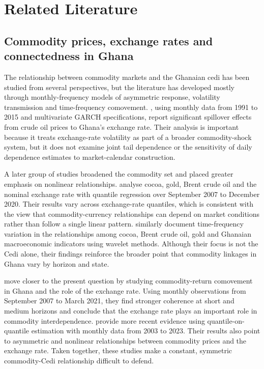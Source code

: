\section{Related Literature}
\label{sec:related_literature}

\subsection{Commodity prices, exchange rates and connectedness in Ghana}

The relationship between commodity markets and the Ghanaian cedi has been studied from several perspectives, but the literature has developed mostly through monthly-frequency models of asymmetric response, volatility transmission and time-frequency comovement. \citet{zankawah2020}, using monthly data from 1991 to 2015 and multivariate GARCH specifications, report significant spillover effects from crude oil prices to Ghana's exchange rate. Their analysis is important because it treats exchange-rate volatility as part of a broader commodity-shock system, but it does not examine joint tail dependence or the sensitivity of daily dependence estimates to market-calendar construction.

A later group of studies broadened the commodity set and placed greater emphasis on nonlinear relationships. \citet{archer2022} analyse cocoa, gold, Brent crude oil and the nominal exchange rate with quantile regression over September 2007 to December 2020. Their results vary across exchange-rate quantiles, which is consistent with the view that commodity-currency relationships can depend on market conditions rather than follow a single linear pattern. \citet{boateng2022} similarly document time-frequency variation in the relationships among cocoa, Brent crude oil, gold and Ghanaian macroeconomic indicators using wavelet methods. Although their focus is not the Cedi alone, their findings reinforce the broader point that commodity linkages in Ghana vary by horizon and state.

\citet{barson2023} move closer to the present question by studying commodity-return comovement in Ghana and the role of the exchange rate. Using monthly observations from September 2007 to March 2021, they find stronger coherence at short and medium horizons and conclude that the exchange rate plays an important role in commodity interdependence. \citet{yeboah2025} provide more recent evidence using quantile-on-quantile estimation with monthly data from 2003 to 2023. Their results also point to asymmetric and nonlinear relationships between commodity prices and the exchange rate. Taken together, these studies make a constant, symmetric commodity-Cedi relationship difficult to defend.

